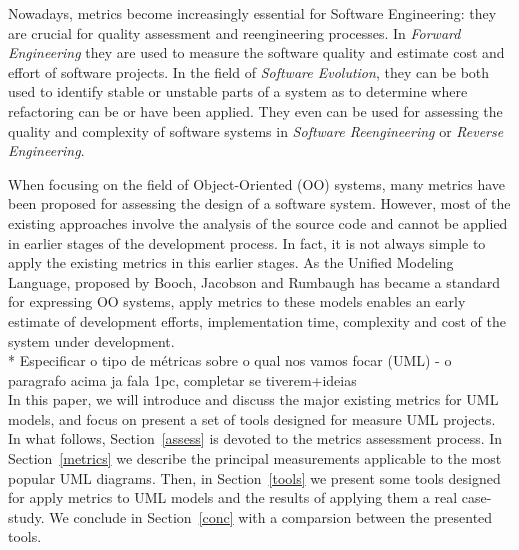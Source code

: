    
Nowadays, metrics become increasingly essential for Software Engineering: they are crucial for quality assessment and reengineering processes.
In \emph{Forward Engineering} they are used to measure the software quality and estimate cost and effort of software projects\cite{Fenton}.
In the field of \emph{Software Evolution}, they can be both used to identify stable or unstable parts of a system as to determine where refactoring can be or have been applied\cite{Serge}.
They even can be used for assessing the quality and complexity of software systems in \emph{Software Reengineering} or \emph{Reverse Engineering}\cite{43044}.

When focusing on the field of Object-Oriented (OO) systems, many metrics have been proposed for assessing the design of a software system.
However, most of the existing approaches involve the analysis of the source code and cannot be applied in earlier stages of the development process.
In fact, it is not always simple to apply the existing metrics in this earlier stages. 
As the \textsf{Unified Modeling Language}, proposed by Booch, Jacobson and Rumbaugh\cite{USDPuml} has became a standard for expressing OO systems, apply metrics to these models enables an early estimate of development efforts, implementation time, complexity and cost of the system under development. \\

  * Especificar o tipo de métricas sobre o qual nos vamos focar (UML) - o paragrafo acima ja fala 1pc, completar se tiverem+ideias\\
  
In this paper, we will introduce and discuss the major existing metrics for UML models, and focus on present a set of tools designed for measure UML projects.
In what follows, Section~\ref{assess} is devoted to the metrics assessment process.
In Section~\ref{metrics} we describe the principal measurements applicable to the most popular UML diagrams.
Then, in Section~\ref{tools} we present some tools designed for apply metrics to UML models and the results of applying them a real case-study.
We conclude in Section~\ref{conc} with a comparsion between the presented tools.
  
    


